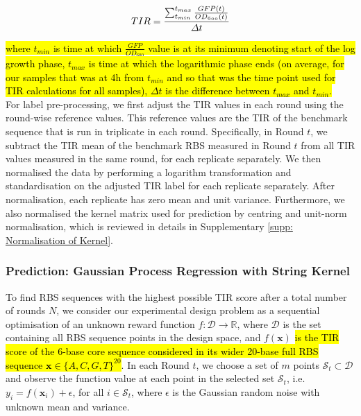 $$\mathnormal{TIR=\frac{\sum_{t_{min}}^{t_{max}}\frac{GFP(t)}{OD_{600}(t)}}{\Delta t}}$$

\hl{where ${t_{min}}$ is time at which $\frac{GFP}{OD_{600}}$ value is at its minimum denoting start of the log growth phase, ${t_{max}}$ is time at which the logarithmic phase ends (on average, for our samples that was at 4h from ${t_{min}}$ and so that was the time point used for TIR calculations for all samples), ${\Delta t}$ is the difference between ${t_{max}}$ and ${t_{min}}$.}\\

For label pre-processing, we first adjust the TIR values in each round using the round-wise reference values.
This reference values are the TIR of the benchmark sequence that is run in triplicate in each round.
Specifically, in Round $t$, we subtract the TIR mean of the benchmark RBS measured in Round $t$ from all TIR values measured in the same round, for each replicate separately.
We then normalised the data by performing a logarithm transformation and standardisation on the adjusted TIR label for each replicate separately.
After normalisation, each replicate has zero mean and unit variance.
Furthermore, we also normalised the kernel matrix used for prediction by centring and unit-norm normalisation, which is reviewed in details in Supplementary \ref{supp: Normalisation of Kernel}.


\subsubsection{Prediction: Gaussian Process Regression with String Kernel}
\label{sec: method prediction with kernel}

To find RBS sequences with the highest possible TIR score after a total number of rounds $N$,  we consider our experimental design problem as a sequential optimisation of an unknown reward function $f: \mathcal{D} \rightarrow \mathbb{R}$, where $\mathcal{D}$ is the set containing all RBS sequence points in the design space, and $f(\mathbf{x})$ \hl{is the TIR score of the 6-base core sequence considered in its wider 20-base full RBS sequence $\mathbf{x} \in \{A,C,G,T\}^{20}$}.
In each Round $t$, we choose a set of $m$ points $\mathcal{S}_t \subset \mathcal{D}$ and observe the function value at each point in the selected set $\mathcal{S}_t$, i.e. $y_i = f(\mathbf{x}_i) + \epsilon$, for all $i \in \mathcal{S}_t$, where $\epsilon$ is the Gaussian random noise with unknown mean and variance. \\

